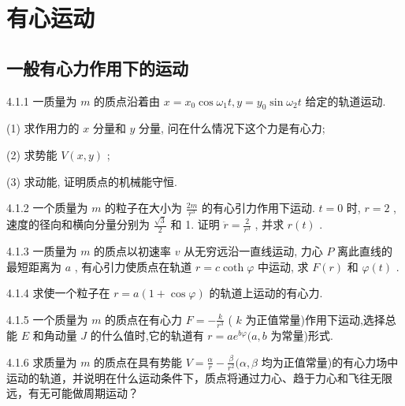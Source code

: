 \chapter{有心运动}

\section{一般有心力作用下的运动}

\begin{problem}{4.1.1}
一质量为 $m$ 的质点沿着由 $x = x_0\cos \omega_1t, y = y_0\sin \omega_2t$ 给定的轨道运动.

(1) 求作用力的 $x$ 分量和 $y$ 分量, 问在什么情况下这个力是有心力;

(2) 求势能 $V(x, y)$ ;

(3) 求动能, 证明质点的机械能守恒.
\end{problem}
\clearpage


\begin{problem}{4.1.2}
一个质量为 $m$ 的粒子在大小为 $\frac{2m}{r^3}$ 的有心引力作用下运动. $t = 0$ 时, $r = 2$ , 速度的径向和横向分量分别为 $\frac{\sqrt{3}}{2}$ 和 1. 证明 $\ddot{r} = \frac{2}{r^3}$ , 并求 $r(t)$ .
\end{problem}
\clearpage


\begin{problem}{4.1.3}
一质量为 $m$ 的质点以初速率 $v$ 从无穷远沿一直线运动, 力心 $P$ 离此直线的最短距离为 $a$ , 有心引力使质点在轨道 $r = c \coth \varphi$ 中运动, 求 $F(r)$ 和 $\varphi(t)$ .
\end{problem}
\clearpage


\begin{problem}{4.1.4}
求使一个粒子在 $r = a(1 + \cos \varphi)$ 的轨道上运动的有心力.
\end{problem}
\clearpage


\begin{problem}{4.1.5}
一个质量为 $m$ 的质点在有心力 $F = -\frac{k}{r^3}$ ( $k$ 为正值常量)作用下运动,选择总能 $E$ 和角动量 $J$ 的什么值时,它的轨道有 $r = ae^{b\varphi}(a,b$ 为常量)形式.
\end{problem}
\clearpage


\begin{problem}{4.1.6}
求质量为 $m$ 的质点在具有势能 $V = \frac{\alpha}{r} - \frac{\beta}{r^2} (\alpha, \beta$ 均为正值常量)的有心力场中运动的轨道，并说明在什么运动条件下，质点将通过力心、趋于力心和飞往无限远，有无可能做周期运动？
\end{problem}
\clearpage


